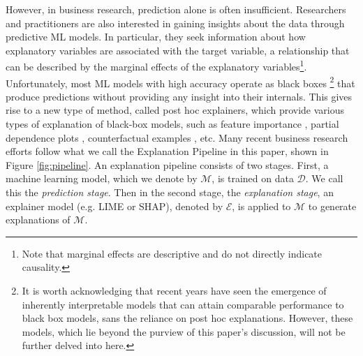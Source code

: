 \documentclass[12pt]{article}  %
\newcommand{\mE}{\mathcal{E}}
\begin{document}
However, in business research, prediction alone is often insufficient. Researchers and practitioners are also interested in gaining insights about the data through predictive ML models. In particular, they seek information about how explanatory variables are associated with the target variable, a relationship that can be described by the marginal effects of the explanatory variables\footnote{Note that marginal effects are descriptive and do not directly indicate causality.}.  %
Unfortunately, most ML models with high accuracy operate as black boxes \footnote{It is worth acknowledging that recent years have seen the emergence of inherently interpretable models that can attain comparable performance to black box models, sans the reliance on post hoc explanations. However, these models, which lie beyond the purview of this paper's discussion, will not be further delved into here.} that produce predictions without providing any insight into their internals. This gives rise to a new type of method, called post hoc explainers, which provide various types of explanation of black-box models, such as feature importance \citep{ribeiro16lime,lundberg17shap}, partial dependence plots \citep{friedman01pdp}, counterfactual examples \citep{mothilal20dice}, etc. %
 Many recent business research efforts follow what we call the Explanation Pipeline in this paper, shown in Figure \ref{fig:pipeline}. %
 An explanation pipeline consists of two stages. First, a machine learning model, which we denote by $\mathcal{M}$, is trained on data $\mathcal{D}$. We call this the \emph{prediction stage}. Then in the second stage, the \emph{explanation stage}, an explainer model (e.g. LIME or SHAP), denoted by $\mathcal{E}$, is applied to $\mathcal{M}$ to generate explanations of $\mathcal{M}$. %
\end{document}
